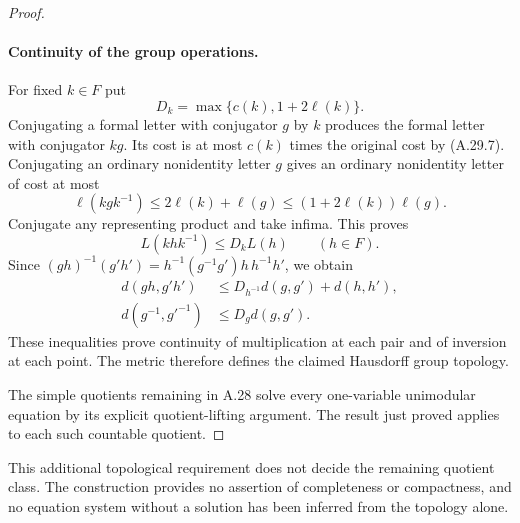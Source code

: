 \begin{proof}
\paragraph{Continuity of the group operations.}
For fixed $k\in F$ put
\[
 D_k=\max\{c(k),1+2\ell(k)\}.
 \tag{A.29.13}
\]
Conjugating a formal letter with conjugator
$g$ by $k$ produces the formal letter with
conjugator $kg$. Its cost is at most $c(k)$
times the original cost by (A.29.7).
Conjugating an ordinary nonidentity letter
$g$ gives an ordinary nonidentity letter of
cost at most
\[
 \ell(kgk^{-1})\leq2\ell(k)+\ell(g)
       \leq(1+2\ell(k))\ell(g).
 \tag{A.29.14}
\]
Conjugate any representing product and take
infima. This proves
\[
 L(khk^{-1})\leq D_k L(h)\qquad(h\in F).
 \tag{A.29.15}
\]
Since
$(gh)^{-1}(g'h')=h^{-1}(g^{-1}g')h\,h^{-1}h'$,
we obtain
\[
 \begin{split}
 d(gh,g'h')&\leq D_{h^{-1}}d(g,g')+d(h,h'),\\
 d(g^{-1},g'^{-1})&\leq D_g d(g,g').
 \end{split}
 \tag{A.29.16}
\]
These inequalities prove continuity of
multiplication at each pair and of inversion
at each point. The metric therefore defines
the claimed Hausdorff group topology.

The simple quotients remaining in A.28
solve every one-variable unimodular equation
by its explicit quotient-lifting argument.
The result just proved applies to each such
countable quotient.
\end{proof}

This additional topological requirement does
not decide the remaining quotient class.
The construction provides no assertion of
completeness or compactness, and no equation
system without a solution has been inferred
from the topology alone.
